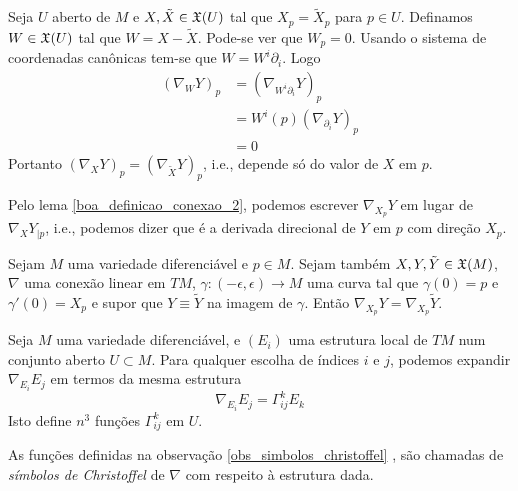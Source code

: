 \begin{demonstracao}
	Seja $U$ aberto de $M$ e $X, \tilde{X} \in \mathfrak{X}(U)$ tal que $X_p = \tilde{X}_p$ para $p \in U$. Definamos $W \in \mathfrak{X}(U)$ tal que $W = X - \tilde{X}$. Pode-se ver que $W_p = 0$. Usando o sistema de coordenadas canônicas tem-se que $W = W^i \partial_i$. Logo
	\begin{align*}
		(\nabla_W Y)_p &= (\nabla_{W^i \partial_i} Y)_p\\
		&=   W^i(p) (\nabla_{\partial_i} Y)_p\\
		&= 0
	\end{align*}
	Portanto $(\nabla_X Y)_p = (\nabla_{\tilde{X}} Y)_p$, i.e., depende só do valor de $X$ em $p$.
\end{demonstracao}

\begin{observacao}
	Pelo lema \ref{boa_definicao_conexao_2}, podemos escrever $\nabla_{X_p} Y$ em lugar de $\nabla_X Y_{|p}$, i.e., podemos dizer que é a derivada direcional de $Y$ em $p$ com direção $X_p$.
\end{observacao}

\begin{lema}\label{conexao-linear-numa-curva}
	Sejam $M$ uma variedade diferenciável e $p \in M$. Sejam também $X, Y, \tilde{Y} \in \mathfrak{X}(M)$, $\nabla$ uma conexão linear em $TM$, $\gamma: (-\epsilon, \epsilon) \rightarrow M$ uma curva tal que $\gamma(0)=p$ e  $\gamma'(0) = X_p$ e supor que $Y \equiv \tilde{Y}$ na imagem de $\gamma$. Então $\nabla_{X_p} Y = \nabla_{X_p} \tilde{Y}$.
\end{lema}

\begin{observacao}\label{obs_simbolos_christoffel}
	Seja $M$ uma variedade diferenciável, e $(E_i)$ uma estrutura local de $TM$ num conjunto aberto $U \subset M$. Para qualquer escolha de índices $i$ e $j$, podemos expandir $\nabla_{E_i} E_j$ em termos da mesma estrutura
	\begin{equation*}
		\nabla_{E_i} E_j = \Gamma^k_{ij} E_k
	\end{equation*}
	Isto define $n^3$ funções $\Gamma^k_{ij}$ em $U$.
\end{observacao}

\begin{definicao} 
	As funções definidas na observação \ref{obs_simbolos_christoffel} , são chamadas de \emph{símbolos de Christoffel} de $\nabla$ com respeito à estrutura dada.
\end{definicao}

